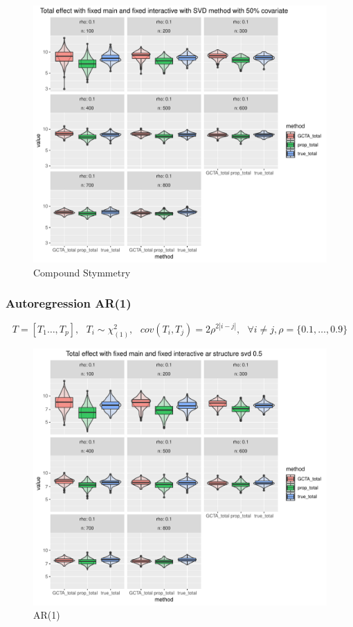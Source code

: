 \documentclass[]{article}
\begin{document}
\begin{figure}
\centering
\includegraphics{./generate_graph_as_pdf/plot_chi_fixed_fixed_total_p_34_rho_0.1_0.9_n_100_800_svd_red_0.5.pdf}
\caption{Compound Stymmetry}
\end{figure}

\subsubsection{Autoregression AR(1)}\label{autoregression-ar1}

\[
  T = [T_1 \dots, T_p] ,~~~ T_i \sim \chi_{(1)}^2, ~~~ cov(T_i, T_j) = 2\rho^{2|i-j|},~~~ \forall  i \ne j, \rho = \{0.1, \dots, 0.9 \} 
\]

\begin{figure}
\centering
\includegraphics{./generate_graph_as_pdf/plot_chi_fixed_fixed_ar_chi_rho_0.1_0.9_n_100_800_p_34_svd_0.5.pdf}
\caption{AR(1)}
\end{figure}
\end{document}
